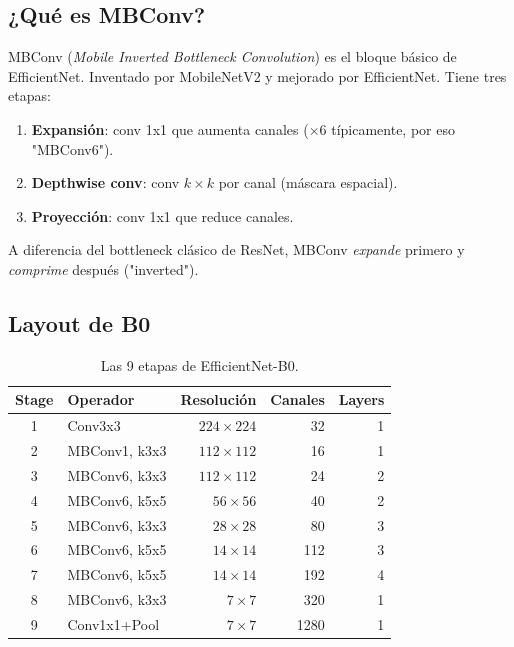 \subsection{¿Qué es MBConv?}

MBConv (\emph{Mobile Inverted Bottleneck Convolution}) es el
bloque básico de EfficientNet. Inventado por MobileNetV2 y
mejorado por EfficientNet. Tiene tres etapas:

\begin{enumerate}
  \item \textbf{Expansión}: conv 1x1 que aumenta canales
        ($\times 6$ típicamente, por eso "MBConv6").
  \item \textbf{Depthwise conv}: conv $k \times k$ por canal
        (máscara espacial).
  \item \textbf{Proyección}: conv 1x1 que reduce canales.
\end{enumerate}

\noindent A diferencia del bottleneck clásico de ResNet, MBConv
\emph{expande} primero y \emph{comprime} después ("inverted").

\subsection{Layout de B0}

\begin{table}[H]
\centering
\caption{Las 9 etapas de EfficientNet-B0.}
\label{tab:effnet-stages-concepto}
\begin{tabular}{clrrr}
\toprule
\textbf{Stage} & \textbf{Operador} & \textbf{Resolución} & \textbf{Canales} & \textbf{Layers} \\
\midrule
1  & Conv3x3       & $224 \times 224$ & 32   & 1 \\
2  & MBConv1, k3x3 & $112 \times 112$ & 16   & 1 \\
3  & MBConv6, k3x3 & $112 \times 112$ & 24   & 2 \\
4  & MBConv6, k5x5 & $56 \times 56$   & 40   & 2 \\
5  & MBConv6, k3x3 & $28 \times 28$   & 80   & 3 \\
6  & MBConv6, k5x5 & $14 \times 14$   & 112  & 3 \\
7  & MBConv6, k5x5 & $14 \times 14$   & 192  & 4 \\
8  & MBConv6, k3x3 & $7 \times 7$     & 320  & 1 \\
9  & Conv1x1+Pool  & $7 \times 7$     & 1280 & 1 \\
\bottomrule
\end{tabular}
\end{table}

